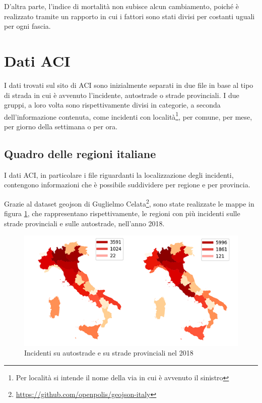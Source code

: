 \documentclass[a4paper]{report}
\begin{document}
D'altra parte, l'indice di mortalità non subisce alcun cambiamento, 
poiché è realizzato tramite 
un rapporto in cui i fattori sono stati divisi per costanti uguali per ogni fascia. 


\section{Dati ACI}

I dati trovati sul sito di ACI sono inizialmente separati in due file in 
base al tipo di strada in cui è avvenuto l'incidente, autostrade o strade provinciali. 
I due gruppi, a loro volta sono rispettivamente divisi in categorie, a seconda 
dell'informazione contenuta, come incidenti con 
località\footnote{Per località si intende il nome della via in cui è avvenuto il sinistro}, 
per comune, per mese, per giorno della settimana o per ora. 

\subsection{Quadro delle regioni italiane}

I dati ACI, in particolare i file riguardanti la 
localizzazione degli incidenti, contengono informazioni che è  
possibile suddividere per regione e per provincia. 

Grazie al dataset geojson di Guglielmo 
Celata\footnote{\url{https://github.com/openpolis/geojson-italy}}, 
sono state realizzate le mappe in figura \ref{fig:incidenti-per-regione}, 
che rappresentano rispettivamente, le regioni con più incidenti 
sulle strade provinciali e sulle autostrade, nell'anno 2018. 

\begin{figure}
    \includegraphics[width=\linewidth]{img_unite/incidenti_autostrade_provinciali.png}
    \caption{Incidenti su autostrade e su strade provinciali nel 2018}
    \label{fig:incidenti-per-regione}
\end{figure}
\end{document}
